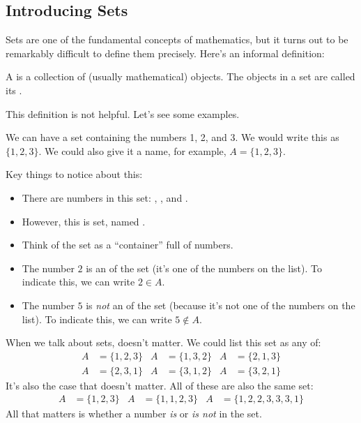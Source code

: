 \subsection{Introducing Sets} 
Sets are one of the fundamental concepts of mathematics, but it turns out to be remarkably difficult to define them precisely. Here's an informal definition:
\begin{definition}
A  is a collection of (usually mathematical) objects. The objects in a set are called its .
\end{definition}
This definition is not helpful. Let's see some examples.
\begin{Example}
We can have a set containing the numbers 1, 2, and 3. We would write this as $\{1,2,3\}$. We could also give it a name, for example, $A=\{1,2,3\}$.
\end{Example}
Key things to notice about this:
\begin{itemize}
\item There are \makeblanksmall numbers in this set: \makeblanksmall, \makeblanksmall, and \makeblanksmall.
\item However, this is \makeblanksmall set, named \makeblanksmall.
\item Think of the set as a ``container'' full of numbers.
\item The number $2$ is an \makeblank of the set \makeblanksmall (it's one of the numbers on the list). To indicate this, we can write $2\in A$.
\item The number $5$ is \emph{not} an \makeblank of the set \makeblanksmall (because it's not one of the numbers on the list). To indicate this, we can write $5\notin A$.
\end{itemize}
When we talk about sets, \makeblank doesn't matter. We could list this set as any of:
\begin{align*}
A&=\{1,2,3\}&
A&=\{1,3,2\}&
A&=\{2,1,3\}\\
A&=\{2,3,1\}&
A&=\{3,1,2\}&
A&=\{3,2,1\}
\end{align*}
It's also the case that \makeblank doesn't matter. All of these are also the same set:
\begin{align*}
A&=\{1,2,3\}&
A&=\{1,1,2,3\}&
A&=\{1,2,2,3,3,3,1\}
\end{align*}
All that matters is whether a number \emph{is} or \emph{is not} in the set.